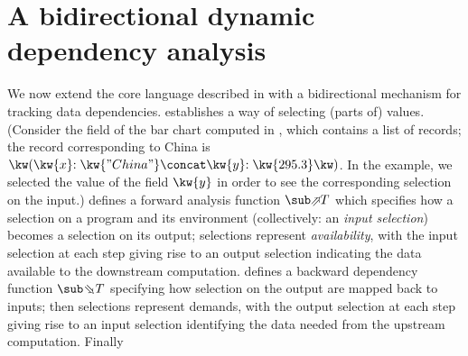 \section{A bidirectional dynamic dependency analysis}
\label{sec:data-dependencies}

We now extend the core language described in  with a bidirectional mechanism for tracking data dependencies.  establishes a way of selecting (parts of) values. (Consider the  field of the bar chart computed in , which contains a list of records; the record corresponding to China is $\exRec{\bind{\kw{x}}{\kw{"China"}} \concat \bind{\kw{y}}{\kw{295.3}}}$. In the example, we selected the value of the field $\kw{y}$ in order to see the corresponding selection on the input.)  defines a forward analysis function $\evalFwdF{T}$ which specifies how a selection on a program and its environment (collectively: an \emph{input selection}) becomes a selection on its output; selections represent \emph{availability}, with the input selection at each step giving rise to an output selection indicating the data available to the downstream computation.  defines a backward dependency function $\evalBwdF{T}$ specifying how selection on the output are mapped back to inputs; then selections represent demands, with the output selection at each step giving rise to an input selection identifying the data needed from the upstream computation. Finally 



